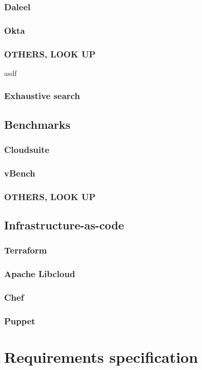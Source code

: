\documentclass{report}
\begin{document}
\subsection{Daleel}
\subsection{Okta}
\subsection{OTHERS, LOOK UP}
asdf
\subsection{Exhaustive search}

\section{Benchmarks}
\subsection{Cloudsuite}
\subsection{vBench}
\subsection{OTHERS, LOOK UP}
\section{Infrastructure-as-code}
\subsection{Terraform}
\subsection{Apache Libcloud}  
\subsection{Chef}
\subsection{Puppet}
\chapter{Requirements specification}
\end{document}
